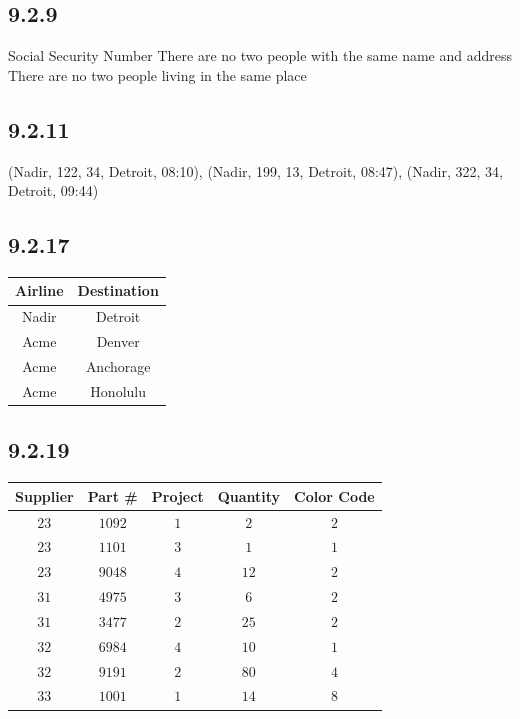 \documentclass[12pt,titlepage]{extarticle}
\begin{document}
\subsection*{9.2.9}
\begin{tasks}
    \task Social Security Number
    \task There are no two people with the same name and address
    \task There are no two people living in the same place
\end{tasks}

\subsection*{9.2.11}
(Nadir, 122, 34, Detroit, 08:10), (Nadir, 199, 13, Detroit, 08:47), (Nadir, 322, 34, Detroit, 09:44)

\subsection*{9.2.17}
\begin{center}
    \begin{tabular}{c|c}
        Airline & Destination \\\hline\hline
        Nadir & Detroit \\
        Acme  & Denver \\
        Acme  & Anchorage \\
        Acme  & Honolulu \\
    \end{tabular}
\end{center}

\subsection*{9.2.19}
\begin{center}
    \begin{tabular}{c|c|c|c|c}
        Supplier & Part \# & Project & Quantity & Color Code \\\hline\hline
        $23$ & $1092$ & $1 $& $2$  & $2$ \\
        $23$ & $1101$ & $3 $& $1$  & $1$ \\
        $23$ & $9048$ & $4 $& $12$ & $2$ \\
        $31$ & $4975$ & $3 $& $6$  & $2$ \\
        $31$ & $3477$ & $2 $& $25$ & $2$ \\
        $32$ & $6984$ & $4 $& $10$ & $1$ \\
        $32$ & $9191$ & $2 $& $80$ & $4$ \\
        $33$ & $1001$ & $1 $& $14$ & $8$
    \end{tabular}
\end{center}
\end{document}
